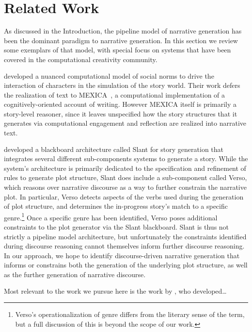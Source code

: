 \section{Related Work}

As discussed in the Introduction, the pipeline model of narrative generation 
has been the dominant paradigm to narrative generation. In this section we
review some exemplars of that model, with special focus on systems that have
been covered in the computational creativity community.

 developed a nuanced computational model of social
norms to drive the interaction of characters in the simulation of the story
world. Their work defers the realization of text to
MEXICA~\cite{perez2001mexica}, a computational implementation of a
cognitively-oriented account of writing. However MEXICA itself is primarily a
story-level reasoner, since it leaves unspecified how the story structures that
it generates via computational engagement and reflection are realized into
narrative text.

 developed a blackboard architecture called Slant for
story generation that integrates several different sub-components systems to
generate a story. While the system's architecture is primarily dedicated to the
specification and refinement of rules to generate plot structure, Slant does
include a sub-component called Verso, which reasons over narrative discourse as
a way to further constrain the narrative plot. In particular, Verso detects
aspects of the verbs used during the generation of plot structure, and
determines the in-progress story's match to a specific genre.\footnote{Verso's
operationalization of genre differs from the literary sense of the term, but a
full discussion of this is beyond the scope of our work.} Once a specific genre
has been identified, Verso poses additional constraints to the plot generator
via the Slant blackboard. Slant is thus not strictly a pipeline model
architecture, but unfortunately the constraints identified during discourse
reasoning cannot themselves inform further discourse reasoning. In our approach,
we hope to identify discourse-driven narrative generation that informs or
constrains both the generation of the underlying plot structure, as well as the
further generation of narrative discourse.

Most relevant to the work we pursue here is the work by
, who developed\ldots
